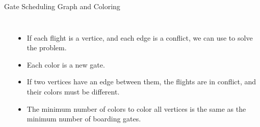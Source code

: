\begin{frame}{Gate Scheduling Graph and Coloring}
    \begin{columns}
      \begin{center}
    \end{center}
      \begin{itemize}
        \item If each flight is a vertice, and each edge is a conflict, we can use  to solve the problem.
        \item Each color is a new gate.
        \item If two vertices have an edge between them, the flights are \alert{in conflict}, and their colors must be different.
        \item The minimum number of colors to color all vertices is the same as the minimum number of boarding gates.
      \end{itemize}
    \end{columns}
\end{frame}


